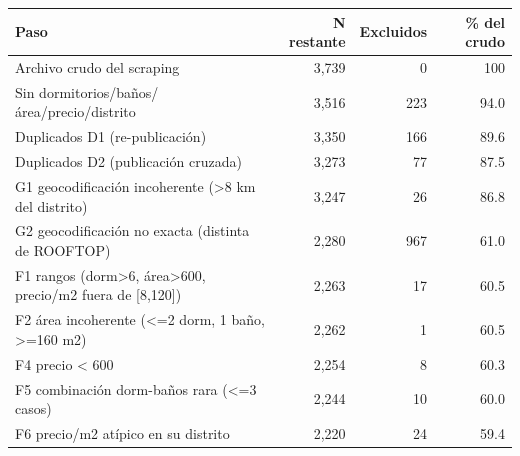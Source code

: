 \begin{tabular}{lrrr}
\toprule
Paso & N restante & Excluidos & \% del crudo \\
\midrule
Archivo crudo del scraping & 3,739 & 0 & 100 \\
Sin dormitorios/baños/área/precio/distrito & 3,516 & 223 & 94.0 \\
Duplicados D1 (re-publicación) & 3,350 & 166 & 89.6 \\
Duplicados D2 (publicación cruzada) & 3,273 & 77 & 87.5 \\
G1 geocodificación incoherente (>8 km del distrito) & 3,247 & 26 & 86.8 \\
G2 geocodificación no exacta (distinta de ROOFTOP) & 2,280 & 967 & 61.0 \\
F1 rangos (dorm>6, área>600, precio/m2 fuera de [8,120]) & 2,263 & 17 & 60.5 \\
F2 área incoherente (<=2 dorm, 1 baño, >=160 m2) & 2,262 & 1 & 60.5 \\
F4 precio < 600 & 2,254 & 8 & 60.3 \\
F5 combinación dorm-baños rara (<=3 casos) & 2,244 & 10 & 60.0 \\
F6 precio/m2 atípico en su distrito & 2,220 & 24 & 59.4 \\
\bottomrule
\end{tabular}